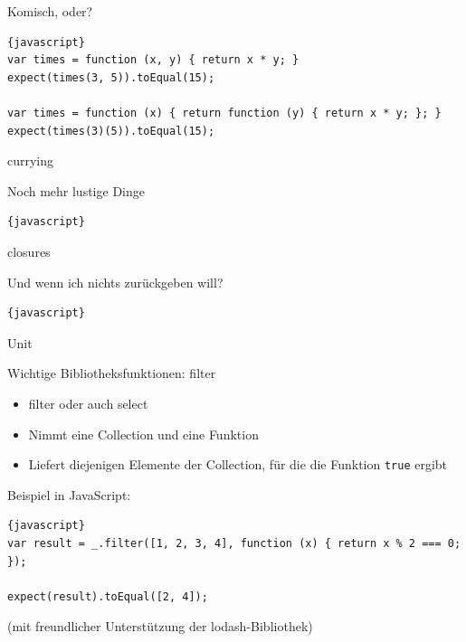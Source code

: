\begin{frame}[fragile]{Komisch, oder?}

\begin{lstlisting}{javascript}
var times = function (x, y) { return x * y; }
expect(times(3, 5)).toEqual(15);

var times = function (x) { return function (y) { return x * y; }; }
expect(times(3)(5)).toEqual(15);
\end{lstlisting}

currying
\end{frame}

\begin{frame}[fragile]{Noch mehr lustige Dinge}

\begin{lstlisting}{javascript}
\end{lstlisting}

closures
\end{frame}

\begin{frame}[fragile]{Und wenn ich nichts zurückgeben will?}

\begin{lstlisting}{javascript}
\end{lstlisting}

Unit
\end{frame}

\begin{frame}[fragile]{Wichtige Bibliotheksfunktionen: filter}
\begin{itemize}
\item filter oder auch select
\item Nimmt eine Collection und eine Funktion
\item Liefert diejenigen Elemente der Collection, für die die Funktion \texttt{true} ergibt
\end{itemize}

Beispiel in JavaScript:
\begin{lstlisting}{javascript}
var result = _.filter([1, 2, 3, 4], function (x) { return x % 2 === 0; });
    
expect(result).toEqual([2, 4]);
\end{lstlisting}
\vfill
(mit freundlicher Unterstützung der lodash-Bibliothek)
\end{frame}

